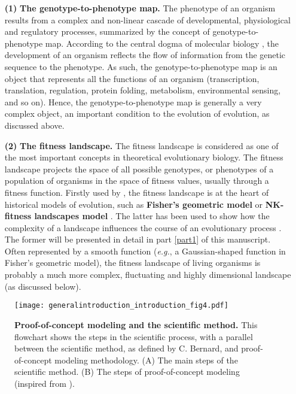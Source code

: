 \begin{enumerate}
\item[\textbf{(1)}] \textbf{The genotype-to-phenotype map.}
The phenotype of an organism results from a complex and non-linear cascade of developmental, physiological and regulatory processes, summarized by the concept of genotype-to-phenotype map. According to the central dogma of molecular biology \citep{crick-1958}, the development of an organism reflects the flow of information from the genetic sequence to the phenotype. As such, the genotype-to-phenotype map is an object that represents all the functions of an organism (transcription, translation, regulation, protein folding, metabolism, environmental sensing, and so on). Hence, the genotype-to-phenotype map is generally a very complex object, an important condition to the evolution of evolution, as discussed above.
\item[\textbf{(2)}] \textbf{The fitness landscape.}
The fitness landscape is considered as one of the most important concepts in theoretical evolutionary biology. The fitness landscape projects the space of all possible genotypes, or phenotypes of a population of organisms in the space of fitness values, usually through a fitness function. Firstly used by \cite{wright-1932}, the fitness landscape is at the heart of historical models of evolution, such as \textbf{Fisher's geometric model} \citep{fisher-1930} or \textbf{NK-fitness landscapes model} \citep{kauffman-levin-1987}. The latter has been used to show how the complexity of a landscape influences the course of an evolutionary process \citep{correia-fonseca-2007}. The former will be presented in detail in part \ref{part1} of this manuscript. Often represented by a smooth function (\textit{e.g.}, a Gaussian-shaped function in Fisher's geometric model), the fitness landscape of living organisms is probably a much more complex, fluctuating and highly dimensional landscape (as discussed below).
\end{enumerate}

\begin{figure}[!ht]
\centering
\texttt{[image: generalintroduction\_introduction\_fig4.pdf]}
\caption[Proof-of-concept modeling and the scientific method.]{{\bf Proof-of-concept modeling and the scientific method.} This flowchart shows the steps in the scientific process, with a parallel between the scientific method, as defined by C. Bernard, and proof-of-concept modeling methodology. (A) The main steps of the scientific method. (B) The steps of proof-of-concept modeling (inspired from \citealt{servedio-et-al-2014}).}
\label{fig:general_introduction:introduction:fig4}
\end{figure}

